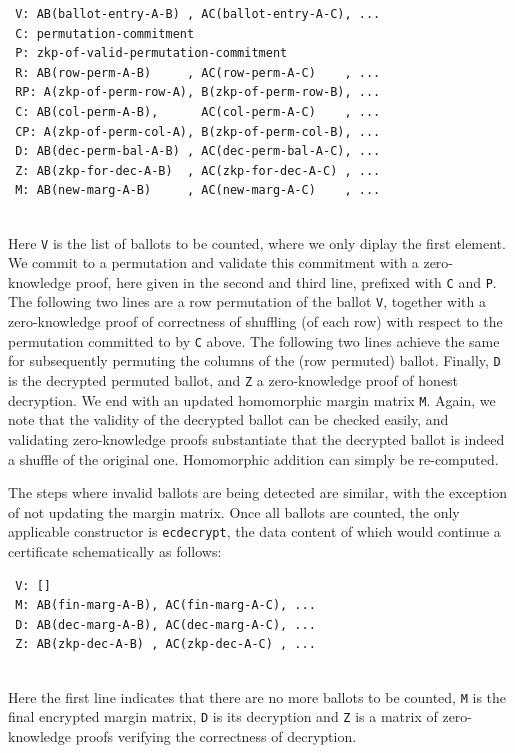  {\small\begin{verbatim}
 V: AB(ballot-entry-A-B) , AC(ballot-entry-A-C), ...
 C: permutation-commitment
 P: zkp-of-valid-permutation-commitment
 R: AB(row-perm-A-B)     , AC(row-perm-A-C)    , ...
 RP: A(zkp-of-perm-row-A), B(zkp-of-perm-row-B), ... 
 C: AB(col-perm-A-B),      AC(col-perm-A-C)    , ...
 CP: A(zkp-of-perm-col-A), B(zkp-of-perm-col-B), ...
 D: AB(dec-perm-bal-A-B) , AC(dec-perm-bal-A-C), ...
 Z: AB(zkp-for-dec-A-B)  , AC(zkp-for-dec-A-C) , ...
 M: AB(new-marg-A-B)     , AC(new-marg-A-C)    , ...
 \end{verbatim}}

 \mbox{}\\[-5ex]
 Here \texttt{V} is the list of ballots to be counted, where we only
 diplay the first element. We
 commit to a permutation and validate this commitment with a
 zero-knowledge proof, here given in the second and third line, prefixed
 with \texttt{C} and \texttt{P}. The following two lines are a row
 permutation of the ballot \texttt{V}, together with a
 zero-knowledge proof of correctness of shuffling (of each row) with
 respect to the permutation committed to by \texttt{C} above. The
 following two lines achieve the same for subsequently permuting the
 columns of the (row permuted) ballot. Finally, \texttt{D} is the
 decrypted permuted ballot, and \texttt{Z} a zero-knowledge proof of
 honest decryption. We end with an updated homomorphic margin
 matrix \texttt{M}. Again, we note that the validity of the
 decrypted ballot can be checked easily, and validating 
 zero-knowledge proofs substantiate that the decrypted ballot is indeed a
 shuffle of the original one. Homomorphic addition can simply be
 re-computed.

 The steps where invalid ballots are being detected are similar, with
 the exception of not updating the margin matrix. Once all ballots
 are counted, the only applicable constructor is \texttt{ecdecrypt},
 the data content of which would continue a certificate
 schematically as follows:

 {\small\begin{verbatim}
 V: []
 M: AB(fin-marg-A-B), AC(fin-marg-A-C), ...
 D: AB(dec-marg-A-B), AC(dec-marg-A-C), ...
 Z: AB(zkp-dec-A-B) , AC(zkp-dec-A-C) , ...
 \end{verbatim}}

 \mbox{}\\[-5ex]
 Here the first line indicates that there are no more ballots to be
 counted, \texttt{M} is the final encrypted margin matrix,
 \texttt{D} is its decryption and \texttt{Z} is a matrix of
 zero-knowledge proofs verifying the correctness of decryption.

